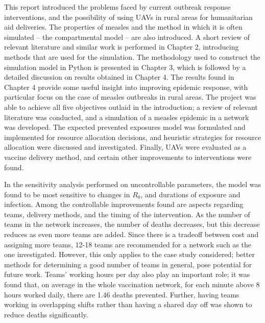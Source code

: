 This report introduced the problems faced by current outbreak response interventions, and the possibility of using UAVs in rural areas for humanitarian aid deliveries. The properties of measles and the method in which it is often simulated -- the compartmental model -- are also introduced. A short review of relevant literature and similar work is performed in Chapter 2, introducing methods that are used for the simulation. The methodology used to construct the simulation model in Python is presented in Chapter 3, which is followed by a detailed discussion on results obtained in Chapter 4. The results found in Chapter 4 provide some useful insight into improving epidemic response, with particular focus on the case of measles outbreaks in rural areas. The project was able to achieve all five objectives outlaid in the introduction; a review of relevant literature was conducted, and a simulation of a measles epidemic in a network was developed. The expected prevented exposures model was formulated and implemented for resource allocation decisions, and heuristic strategies for resource allocation were discussed and investigated. Finally, UAVs were evaluated as a vaccine delivery method, and certain other improvements to interventions were found.

In the sensitivity analysis performed on uncontrollable parameters, the model was found to be most sensitive to changes in $R_{0}$, and durations of exposure and infection. Among the controllable improvements found are aspects regarding teams, delivery methods, and the timing of the intervention. As the number of teams in the network increases, the number of deaths decreases, but this decrease reduces as even more teams are added. Since there is a tradeoff between cost and assigning more teams, 12-18 teams are recommended for a network such as the one investigated. However, this only applies to the case study considered; better methods for determining a good number of teams in general, pose potential for future work. Teams' working hours per day also play an important role; it was found that, on average in the whole vaccination network, for each minute above 8 hours worked daily, there are 1.46 deaths prevented. Further, having teams working in overlapping shifts rather than having a shared day off was shown to reduce deaths significantly. 

